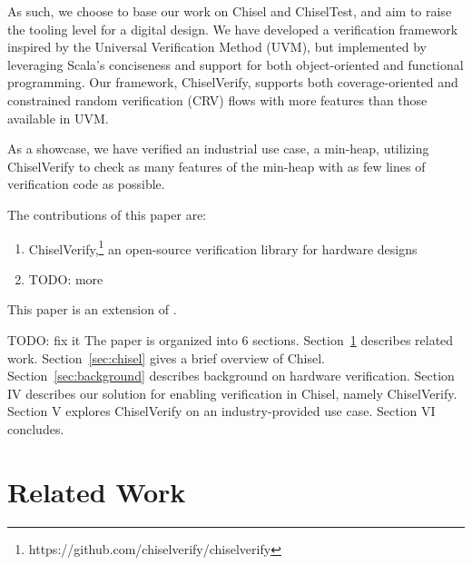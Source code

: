 \documentclass[conference]{IEEEtran}
\newcommand{\todo}[1]{{\color{olive} TODO: #1}}
\begin{document}
As such, we choose to base our work on Chisel and ChiselTest, and aim to raise %
the tooling level for a digital design. We have developed a verification framework %
inspired by the Universal Verification Method (UVM), but implemented by leveraging %
Scala's conciseness and support for both object-oriented and functional programming. %
Our framework, ChiselVerify, supports both coverage-oriented and constrained %
random verification (CRV) flows with more features than those available in UVM. %

As a showcase, we have verified an industrial use case, a min-heap, utilizing 
ChiselVerify to check as many features of the min-heap with as few lines of 
verification code as possible.

The contributions of this paper are:

\begin{enumerate}
\item ChiselVerify,\footnote{https://github.com/chiselverify/chiselverify} an open-source verification library for hardware designs
\item \todo{more}
\end{enumerate}

This paper is an extension of \cite{ChiselVerify:2021}.

\todo{fix it}
The paper is organized into 6 sections.
Section~\ref{sec:related} describes related work.
Section~\ref{sec:chisel} gives a brief overview of Chisel.
Section~\ref{sec:background} describes background on hardware verification.
Section IV describes our solution for enabling verification in Chisel, namely ChiselVerify.
Section V explores ChiselVerify on an industry-provided use case.
Section VI concludes.


\section{Related Work}
\label{sec:related}
\end{document}
